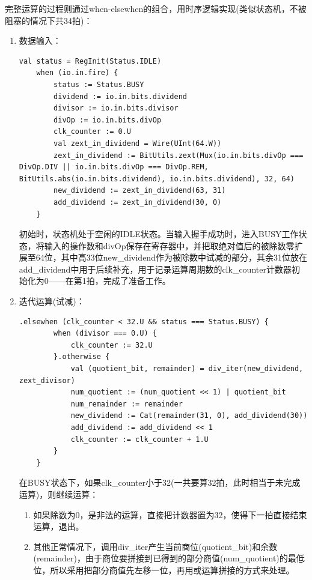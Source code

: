 \documentclass[11pt]{article}
\begin{document}
完整运算的过程则通过when-elsewhen的组合，用时序逻辑实现(类似状态机，不被阻塞的情况下共34拍)：
\begin{enumerate}
    \item 数据输入：
    \begin{lstlisting}[language=Chisel, caption={数据输入}]
    val status = RegInit(Status.IDLE)
    when (io.in.fire) {
        status := Status.BUSY
        dividend := io.in.bits.dividend
        divisor := io.in.bits.divisor
        divOp := io.in.bits.divOp
        clk_counter := 0.U
        val zext_in_dividend = Wire(UInt(64.W))
        zext_in_dividend := BitUtils.zext(Mux(io.in.bits.divOp === DivOp.DIV || io.in.bits.divOp === DivOp.REM, BitUtils.abs(io.in.bits.dividend), io.in.bits.dividend), 32, 64)
        new_dividend := zext_in_dividend(63, 31)
        add_dividend := zext_in_dividend(30, 0)
    }
    \end{lstlisting}

    初始时，状态机处于空闲的IDLE状态。当输入握手成功时，进入BUSY工作状态，将输入的操作数和divOp保存在寄存器中，并把取绝对值后的被除数零扩展至64位，其中高33位new_dividend作为被除数中试减的部分，其余31位放在add_dividend中用于后续补充，用于记录运算周期数的clk_counter计数器初始化为0——在第1拍，完成了准备工作。

    \item 迭代运算(试减)：
    \begin{lstlisting}[language=Chisel, caption={迭代试减(num_quotient和num_remainder用于保存最终结果)}]
    .elsewhen (clk_counter < 32.U && status === Status.BUSY) {
        when (divisor === 0.U) {
            clk_counter := 32.U
        }.otherwise {
            val (quotient_bit, remainder) = div_iter(new_dividend, zext_divisor)
            num_quotient := (num_quotient << 1) | quotient_bit
            num_remainder := remainder
            new_dividend := Cat(remainder(31, 0), add_dividend(30))
            add_dividend := add_dividend << 1
            clk_counter := clk_counter + 1.U
        }
    }
    \end{lstlisting}
    在BUSY状态下，如果clk_counter小于32(一共要算32拍，此时相当于未完成运算)，则继续运算：
    \begin{enumerate}
        \item 如果除数为0，是非法的运算，直接把计数器置为32，使得下一拍直接结束运算，退出。
        \item 其他正常情况下，调用div_iter产生当前商位(quotient_bit)和余数(remainder)，由于商位要拼接到已得到的部分商值(num_quotient)的最低位，所以采用把部分商值先左移一位，再用或运算拼接的方式来处理。
        

\end{enumerate}
\end{enumerate}
\end{document}
